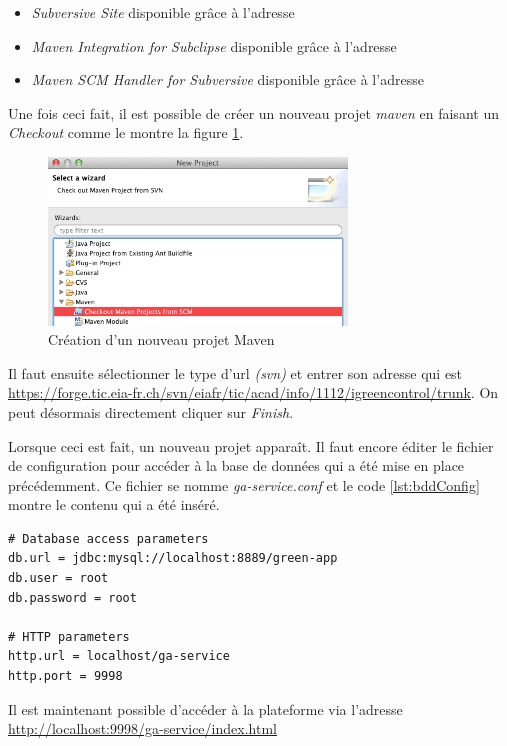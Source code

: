 \medskip

\begin{itemize}
    \item \emph{Subversive Site} disponible grâce à l'adresse \cite{online:eclipse:subversive}
    \item \emph{Maven Integration for Subclipse} disponible grâce à l'adresse \cite{online:eclipse:mavensubclipse}
    \item \emph{Maven SCM Handler for Subversive} disponible grâce à l'adresse \cite{online:eclipse:scm}
\end{itemize}

\medskip

Une fois ceci fait, il est possible de créer un nouveau projet \emph{\gls{maven}} en faisant un \emph{Checkout} comme le montre la figure \ref{gra:mavenProjectCheckout}.

\begin{figure}[H]
    	\centering
    	\includegraphics[width=300px]{00_media/02_mavenProjet.png}
    	\caption{Création d'un nouveau projet Maven}
    	\label{gra:mavenProjectCheckout}
\end{figure}

Il faut ensuite sélectionner le type d'url \emph{(svn)} et entrer son adresse qui est \url{https://forge.tic.eia-fr.ch/svn/eiafr/tic/acad/info/1112/igreencontrol/trunk}. On peut désormais directement cliquer sur \emph{Finish}.

\medskip

Lorsque ceci est fait, un nouveau projet apparaît. Il faut encore éditer le fichier de configuration pour accéder à la base de données qui a été mise en place précédemment. Ce fichier se nomme \emph{ga-service.conf} et le code \ref{lst:bddConfig} montre le contenu qui a été inséré.

\begin{lstlisting}[language={XML}, caption={Fichier de configuration BDD}, label={lst:bddConfig}]
# Database access parameters
db.url = jdbc:mysql://localhost:8889/green-app
db.user = root
db.password = root

# HTTP parameters
http.url = localhost/ga-service
http.port = 9998
\end{lstlisting}

Il est maintenant possible d'accéder à la plateforme via l'adresse \url{http://localhost:9998/ga-service/index.html}
